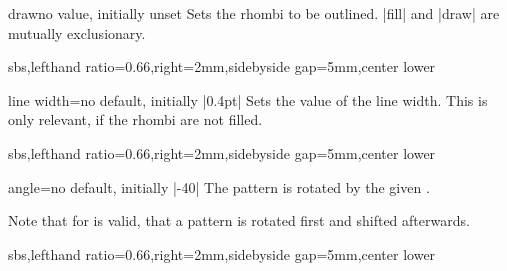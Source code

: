 \documentclass[a4paper,11pt]{article}
\begin{document}
\begin{myvoid}
\begin{docPatternKey}[][doc label=draw@rhombus]{draw}{}{no value, initially unset}
  Sets the rhombi to be outlined. |fill| and |draw| are mutually exclusionary.
\begin{dispExample*}{sbs,lefthand ratio=0.66,right=2mm,sidebyside gap=5mm,center lower}
\end{dispExample*}
\end{docPatternKey}


\begin{docPatternKey}[][doc label=line width@rhombus]{line width}{=}{no default, initially |0.4pt|}
  Sets the  value of the line width. This is only relevant, if
  the rhombi are not filled.

\begin{dispExample*}{sbs,lefthand ratio=0.66,right=2mm,sidebyside gap=5mm,center lower}
\end{dispExample*}
\end{docPatternKey}


\begin{docPatternKey}[][doc label=angle@rhombus]{angle}{=}{no default, initially |-40|}
  The pattern is rotated by the given .
  \par
  Note that for  is valid, that a pattern is rotated first and shifted afterwards.
\begin{dispExample*}{sbs,lefthand ratio=0.66,right=2mm,sidebyside gap=5mm,center lower}
\end{dispExample*}
\end{docPatternKey}

\clearpage


\end{myvoid}
\end{document}
